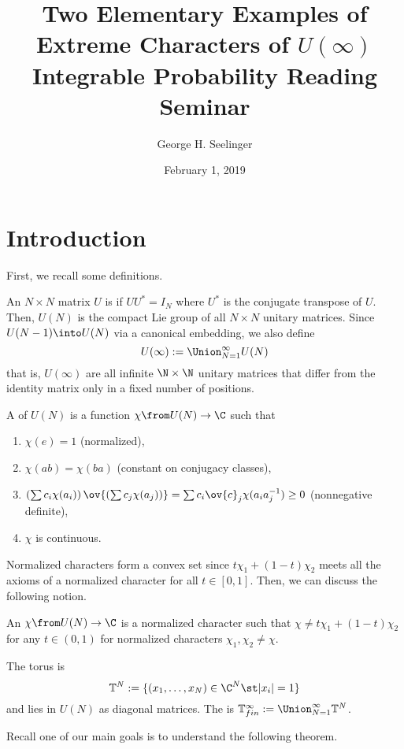 \documentclass[11pt,leqno,oneside]{amsart}
\title[Two Elementary Examples of Extreme Characters of
  \(U(\infty)\)]{Two Elementary Examples of Extreme Characters of
  \(U(\infty)\) \\ Integrable Probability Reading Seminar}
\author{George H. Seelinger}
\date{February 1, 2019}
\numberwithin{thm}{section}
\newcommand{\T}{\mathbb{T}} %
\begin{document}
\maketitle
\section{Introduction}
First, we recall some definitions.
\begin{defn}
  An \(N \times N\) matrix \(U\) is  if \(U U^* = I_N\)
  where \(U^*\) is the conjugate transpose of \(U\). Then, \(U(N)\) is
  the compact Lie group of all \(N \times N\) unitary matrices. Since
  \(U(N-1) \into U(N)\) via a canonical embedding, we also define \[
    U(\infty) := \Union_{N=1}^\infty U(N)
  \]
  that is, \(U(\infty)\) are all infinite \(\N \times \N\) unitary
  matrices that differ from the identity matrix only in a fixed number
  of positions.
\end{defn}
\begin{defn}
  A  of \(U(N)\) is a function \(\chi
  \from U(N) \to \C\) such that
  \begin{enumerate}
  \item \(\chi(e) = 1\) (normalized),
  \item \(\chi(ab) = \chi(ba)\) (constant on conjugacy classes),
  \item \(\left( \sum c_i \chi(a_i) \right)\ov{\left( \sum c_j
        \chi(a_j) \right)} = \sum c_i \ov{c}_j \chi(a_i a_j^{-1}) \geq
    0\) (nonnegative 
    definite),
  \item \(\chi\) is continuous.
  \end{enumerate}
\end{defn}
Normalized characters form a convex set since \(t \chi_1 + (1-t)
\chi_2\) meets all the axioms of a normalized character for all \(t
\in [0,1]\). Then, we can discuss the following notion.
\begin{defn}
  An  \(\chi \from U(N) \to \C\) is a normalized
  character such that \(\chi \neq t \chi_1 + (1-t) \chi_2\) for any
  \(t \in (0,1)\) for normalized characters \(\chi_1,\chi_2 \neq
  \chi\). 
\end{defn}
\begin{defn}
  The  torus is \[
    \T^N := \{(x_1, \ldots, x_N) \in \C^N \st |x_i| = 1\}
  \]
  and lies in \(U(N)\) as diagonal matrices. The 
  is \(\T^\infty_{fin} := \Union_{N=1}^\infty \T^N\).
\end{defn}
Recall one of our main goals is to understand the following theorem.
\end{document}
